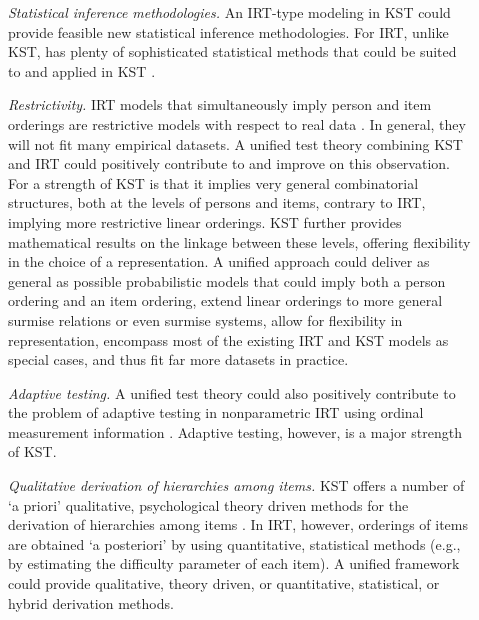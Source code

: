 \documentclass[nojss]{jss}
\begin{document}
\begin{description}
\item[\hspace{-0.165cm}]
\textit{Statistical inference methodologies.}
An IRT-type modeling in KST could provide feasible new statistical inference methodologies. 
For IRT, unlike KST, has plenty of sophisticated statistical methods that could be suited to and applied in KST \citep[e.g.,][]{SkronRabe:04}.

\item[\hspace{-0.165cm}]
\textit{Restrictivity.} 
IRT models that simultaneously imply person and item orderings are restrictive models 
with respect to real data \citep[e.g.,][]{SijtMole:02}. 
In general, they will not fit many empirical datasets. 
A unified test theory combining KST and IRT could positively contribute to and improve 
on this observation. For a strength of KST is that it implies very general combinatorial structures, 
both at the levels of persons and items, contrary to IRT, implying more restrictive linear orderings.
KST further provides mathematical results on the linkage between these levels, offering flexibility 
in the choice of a representation.
A unified approach could deliver as general as possible probabilistic models that could
imply both a person ordering and an item ordering, extend linear orderings to more general 
surmise relations or even surmise systems, allow for flexibility
in representation, 
encompass most of the existing IRT and KST models as special cases, and thus fit 
far more datasets in practice.  
 
\item[\hspace{-0.165cm}]
\textit{Adaptive testing.}
A unified test theory could also positively contribute 
to the problem of adaptive testing in nonparametric IRT 
using ordinal measurement information \citep[e.g.,][]{HuisMole:01}.
Adaptive testing, however, is a major strength of KST.

\item[\hspace{-0.165cm}]
\textit{Qualitative derivation of hierarchies among items.}
KST offers a number of `a priori' qualitative, psychological theory driven 
methods for the derivation of hierarchies among items 
\citep[e.g.,][]{AL:99}.
In IRT, however, orderings of items are obtained `a posteriori' by using 
quantitative, statistical methods (e.g., by estimating the difficulty parameter of each item). 
A unified framework could provide qualitative, theory driven, or quantitative, statistical, 
or hybrid derivation methods. 
\end{description}
\end{document}
